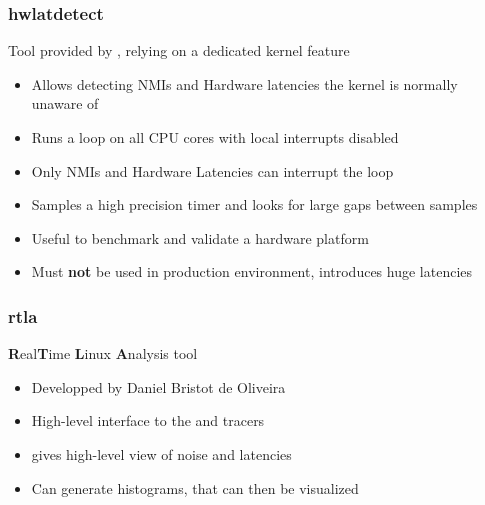 \begin{frame}
        \frametitle{hwlatdetect}
        Tool provided by , relying on a dedicated kernel feature
        \begin{itemize}
                \item Allows detecting NMIs and Hardware latencies the kernel is normally unaware of
                \item Runs a loop on all CPU cores with local interrupts disabled
                \item Only NMIs and Hardware Latencies can interrupt the loop
                \item Samples a high precision timer and looks for large gaps between samples
                \item Useful to benchmark and validate a hardware platform
                \item Must \textbf{not} be used in production environment, introduces huge latencies
        \end{itemize}
\end{frame}

\begin{frame}
        \frametitle{rtla}
        \textbf{R}eal\textbf{T}ime \textbf{L}inux \textbf{A}nalysis tool
        \begin{itemize}
                \item Developped by Daniel Bristot de Oliveira
                \item High-level interface to the  and  tracers
                \item {} gives high-level view of noise and latencies
                \item Can generate histograms, that can then be visualized
        \end{itemize}

\end{frame}

